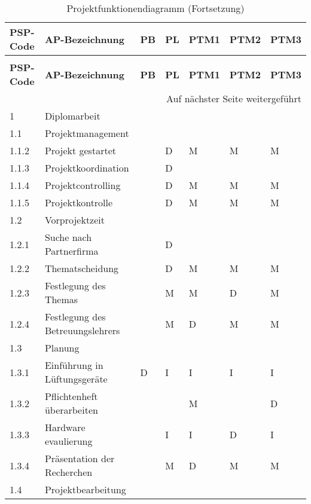\begin{longtable}{p{} p{} p{}  p{} p{} p{} p{}}
	\caption{Projektfunktionendiagramm}
	\label{tab:funktionendiagramm}
	\\ \toprule
	\textbf{PSP-Code} & \textbf{AP-Bezeichnung} & \textbf{PB} & \textbf{PL} & \textbf{PTM1} & \textbf{PTM2} & \textbf{PTM3}
	\\ \midrule
	\endfirsthead
	\caption{Projektfunktionendiagramm (Fortsetzung)}
	\\ \toprule
	\textbf{PSP-Code} & \textbf{AP-Bezeichnung} & \textbf{PB} & \textbf{PL} & \textbf{PTM1} & \textbf{PTM2} & \textbf{PTM3}
	\\ \midrule
	\endhead
	\midrule
	\multicolumn{7}{r}{{Auf nächster Seite weitergeführt}} 
	\\ \bottomrule
	\endfoot
	\bottomrule
	\endlastfoot
	\rowcolor{mygray} 1 & Diplomarbeit & & & & & \\ \midrule
	\rowcolor{mygray2}1.1 & Projektmanagement & & & & &\\ \midrule
	1.1.2 & Projekt gestartet & & D & M & M & M \\ \midrule
	1.1.3 & Projektkoordination & & D & & & \\ \midrule
	1.1.4 & Projektcontrolling & & D & M & M & M \\ \midrule
	1.1.5 & Projektkontrolle & & D & M & M & M \\ \midrule
	\rowcolor{mygray2}1.2 & Vorprojektzeit & & & & & \\ \midrule
	1.2.1 & Suche nach Partnerfirma & & D & & & \\ \midrule
	1.2.2 & Thematscheidung & & D & M & M & M \\ \midrule
	1.2.3 & Festlegung des Themas & & M & M & D & M \\ \midrule
	1.2.4 & Festlegung des Betreuungslehrers & & M & D & M & M \\ \midrule
	\rowcolor{mygray2}1.3 & Planung & & & & & \\
	1.3.1 & Einführung in Lüftungsgeräte & D & I & I & I & I \\ \midrule
	1.3.2 & Pflichtenheft überarbeiten & & & M & & D \\ \midrule
	1.3.3 & Hardware evaulierung & & I & I & D & I \\ \midrule
	1.3.4 & Präsentation der Recherchen & & M & D & M & M \\ \midrule
	\rowcolor{mygray2}1.4 & Projektbearbeitung & & & & & \\ \midrule

\end{longtable}
